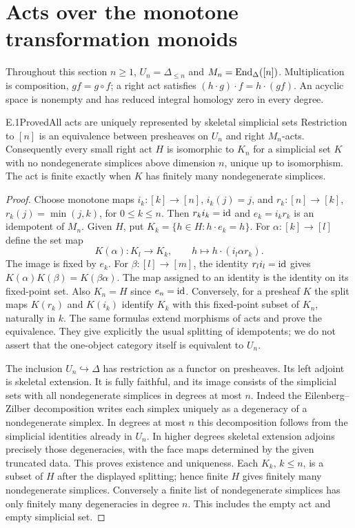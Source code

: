 \section{Acts over the monotone transformation monoids}
\label{sec:E}

Throughout this section $n\geq1$, $U_n=\Delta_{\leq n}$ and
$M_n=\operatorname{End}_\Delta([n])$. Multiplication is composition, $gf=g\circ f$;
a right act satisfies $(h\cdot g)\cdot f=h\cdot(gf)$. An acyclic
space is nonempty and has reduced integral homology zero in every degree.

\begin{claim}{E.1}{Proved}{All acts are uniquely represented by skeletal simplicial sets}
\label{E:acts}
Restriction to $[n]$ is an equivalence between presheaves on $U_n$ and
right $M_n$-acts. Consequently every small right act $H$ is isomorphic
to $K_n$ for a simplicial set $K$ with no nondegenerate simplices above
dimension $n$, unique up to isomorphism. The act is finite exactly when
$K$ has finitely many nondegenerate simplices.
\end{claim}
\begin{proof}
Choose monotone maps $i_k:[k]\to[n]$, $i_k(j)=j$, and
$r_k:[n]\to[k]$, $r_k(j)=\min(j,k)$, for $0\leq k\leq n$.
Then $r_ki_k=\mathrm{id}$ and $e_k=i_kr_k$ is an idempotent of $M_n$.
Given $H$, put $K_k=\{h\in H:h\cdot e_k=h\}$. For
$\alpha:[k]\to[l]$ define the set map
\[
 K(\alpha):K_l\longrightarrow K_k,
 \qquad h\longmapsto h\cdot(i_l\alpha r_k).
\]
The image is fixed by $e_k$. For $\beta:[l]\to[m]$, the identity
$r_li_l=\mathrm{id}$ gives
$K(\alpha)K(\beta)=K(\beta\alpha)$. The map assigned to an identity
is the identity on its fixed-point set. Also $K_n=H$ since $e_n=\mathrm{id}$.
Conversely, for a presheaf $K$ the split maps $K(r_k)$ and $K(i_k)$
identify $K_k$ with this fixed-point subset of $K_n$, naturally in $k$.
The same formulas extend morphisms of acts and prove the equivalence.
They give explicitly the usual splitting of idempotents; we do not
assert that the one-object category itself is equivalent to $U_n$.

The inclusion $U_n\hookrightarrow\Delta$ has restriction as a functor
on presheaves. Its left adjoint is skeletal extension. It is fully
faithful, and its image consists of the simplicial sets with all
nondegenerate simplices in degrees at most $n$. Indeed the
Eilenberg--Zilber decomposition writes each simplex uniquely as a
degeneracy of a nondegenerate simplex. In degrees at most $n$ this
decomposition follows from the simplicial identities already in
$U_n$. In higher degrees skeletal extension adjoins precisely those
degeneracies, with the face maps determined by the given truncated
data. This proves existence and uniqueness. Each $K_k$, $k\leq n$,
is a subset of $H$ after the displayed splitting; hence finite $H$
gives finitely many nondegenerate simplices. Conversely a finite
list of nondegenerate simplices has only finitely many degeneracies
in degree $n$. This includes the empty act and empty simplicial set.
\end{proof}

